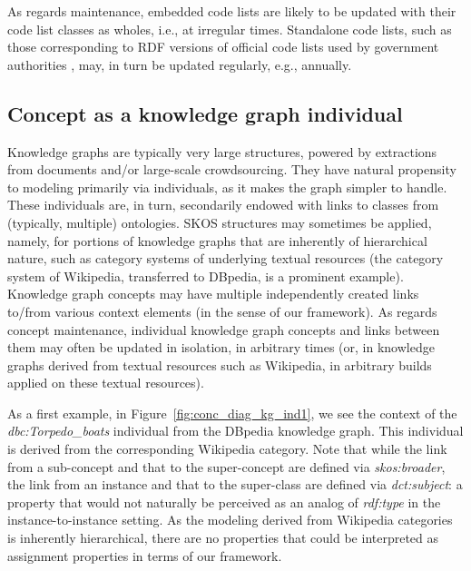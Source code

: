 As regards maintenance, embedded code lists are likely to be updated with their code list classes as wholes, i.e., at irregular times.
Standalone code lists, such as those corresponding to RDF versions of official code lists used by government authorities \cite{DBLP:conf/smap/FilippidisKKIB16}, may, in turn be updated regularly, e.g., annually.

\subsection{Concept as a knowledge graph individual}

Knowledge graphs are typically very large structures, powered by extractions from documents and/or large-scale crowdsourcing.
They have natural propensity to modeling primarily via individuals, as it makes the graph simpler to handle.
These individuals are, in turn, secondarily endowed with links to classes from (typically, multiple) ontologies.
SKOS structures may sometimes be applied, namely, for portions of knowledge graphs that are inherently of hierarchical nature, such as category systems of underlying textual resources (the category system of Wikipedia, transferred to DBpedia, is a prominent example).
Knowledge graph concepts may have multiple independently created links to/from various context elements (in the sense of our framework).
As regards concept maintenance, individual knowledge graph concepts and links between them may often be updated in isolation, in arbitrary times (or, in knowledge graphs derived from textual resources such as Wikipedia, in arbitrary builds applied on these textual resources).

As a first example, in Figure~\ref{fig:conc_diag_kg_ind1}, we see the context of the \emph{dbc:Torpedo\_boats} individual from the DBpedia knowledge graph.
This individual is derived from the corresponding Wikipedia category.
Note that while the link from a sub-concept and that to the super-concept are defined via \emph{skos:broader}, the link from an instance and that to the super-class are defined via \emph{dct:subject}: a property that would not naturally be perceived as an analog of \emph{rdf:type} in the instance-to-instance setting.  
As the modeling derived from Wikipedia categories is inherently hierarchical, there are no properties that could be interpreted as assignment properties in terms of our framework.

